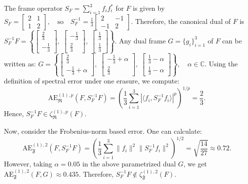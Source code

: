 \documentclass[final,1p,times]{elsarticle}
\begin{document}
\noindent
The frame operator $S_F = \sum_{i=1}^3 f_i f_i^*$ for $F$ is given by $S_F = \begin{bmatrix} 2 & 1 \\ 1 & 2 \end{bmatrix}, \quad \text{so} \quad S_F^{-1} = \frac{1}{3} \begin{bmatrix} 2 & -1 \\ -1 & 2 \end{bmatrix}.$
Therefore, the canonical dual of $F$ is \(S_F^{-1}F = \left\{
\begin{bmatrix} \frac{2}{3} \\[2pt] -\frac{1}{3} \end{bmatrix},\;
\begin{bmatrix} -\frac{1}{3} \\[2pt] \frac{2}{3} \end{bmatrix},\;
\begin{bmatrix} \frac{1}{3} \\[2pt] \frac{1}{3} \end{bmatrix}
\right\}. \)  Any dual frame $G = \{g_i\}_{i=1}^3$ of $F$ can be written as:
\(
G = \left\{
\begin{bmatrix} \frac{2}{3} \\[2pt] -\frac{1}{3} + \alpha \end{bmatrix},\;
\begin{bmatrix} -\frac{1}{3} + \alpha \\[2pt] \frac{2}{3} \end{bmatrix},\;
\begin{bmatrix} \frac{1}{3} - \alpha \\[2pt] \frac{1}{3} - \alpha \end{bmatrix}
\right\}, \quad \alpha \in \mathbb{C}.
\) Using the definition of spectral error under one erasure, we compute: $$\mathrm{AE}_{\mathfrak{R}}^{(1),p}(F, S_F^{-1}F) = \left( \frac{1}{3} \sum_{i=1}^3 \left| \langle f_i, S_F^{-1}f_i \rangle \right|^p \right)^{1/p} = \frac{2}{3}.$$
Hence, $S_F^{-1}F \in \zeta_{\mathfrak{R}}^{(1),p}(F).$

Now, consider the Frobenius-norm based error. One can calculate:
\[
\mathrm{AE}_{\mathfrak{F}}^{(1),2}(F, S_F^{-1}F) = \left( \frac{1}{3} \sum_{i=1}^3 \|f_i\|^2 \|S_F^{-1} f_i\|^2 \right)^{1/2} = \sqrt{\frac{14}{27}} \approx 0.72.
\]
However, taking $\alpha = 0.05$ in the above parametrized dual $G$, we get $\mathrm{AE}_{\mathfrak{F}}^{(1),2}(F, G) \approx 0.435 .$ Therefore, $S_F^{-1}F \notin \zeta_{\mathfrak{F}}^{(1),2}(F).$
\end{document}
